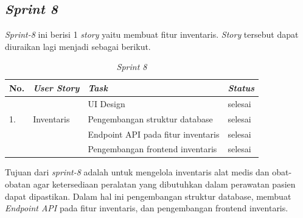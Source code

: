 \subsection{\textit{Sprint 8}}
\textit{Sprint-8} ini berisi 1 \textit{story} yaitu membuat fitur inventaris. \textit{Story} tersebut dapat diuraikan lagi menjadi sebagai berikut.
	\begin{table}[H]
	\caption{\textit{Sprint 8}}
	\label{sprint8_backlog}
	\begin{tabular}{@{} |p{0.5cm}|p{5cm}|p{5cm}|p{2cm}| @{}}
		\hline
		\textbf{No.} & \textbf{\textit{User Story}} & \textbf{\textit{Task}} & \textbf{\textit{Status}} \\
		\hline
		\multirow{3}{3cm}{1.} & \multirow{3}{5cm}{Inventaris} & UI Design & selesai\\
		\cline{3-4}
		 & & Pengembangan struktur database & selesai\\
		\cline{3-4}
		& & Endpoint API pada fitur inventaris & selesai\\
		\cline{3-4}
		 & & Pengembangan frontend inventaris & selesai\\
		\cline{3-4}
		\hline
	\end{tabular}
	\end{table}
Tujuan dari \textit{sprint-8} adalah untuk mengelola inventaris alat medis dan obat-obatan agar ketersediaan peralatan yang dibutuhkan dalam perawatan pasien dapat dipastikan. Dalam hal ini pengembangan struktur database, membuat \textit{Endpoint API} pada fitur inventaris, dan pengembangan frontend inventaris.

